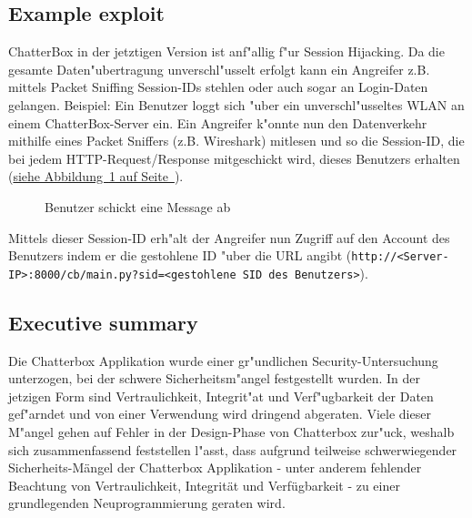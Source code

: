 \documentclass[12pt,a4paper,titlepage,oneside]{scrartcl}
\begin{document}
\subsection{Example exploit}
ChatterBox in der jetztigen Version ist anf"allig f"ur Session Hijacking. Da die gesamte Daten"ubertragung unverschl"usselt erfolgt kann ein Angreifer z.B. mittels Packet Sniffing Session-IDs stehlen oder auch sogar an Login-Daten gelangen.
\newline
\newline
Beispiel:
\newline
Ein Benutzer loggt sich "uber ein unverschl"usseltes WLAN an einem ChatterBox-Server ein. Ein Angreifer k"onnte nun den Datenverkehr mithilfe eines Packet Sniffers (z.B. Wireshark) mitlesen und so die Session-ID, die bei jedem HTTP-Request/Response mitgeschickt wird, dieses Benutzers erhalten (\hyperref[fig:message]{siehe Abbildung~\ref*{fig:message} auf Seite~\pageref*{fig:message}}).
\begin{figure}[h!]
  \centering
  \caption{Benutzer schickt eine Message ab}
  \label{fig:message}
\end{figure}
\newline
\newline
Mittels dieser Session-ID erh"alt der Angreifer nun Zugriff auf den Account des Benutzers indem er die gestohlene ID "uber die URL angibt (\lstinline{http://<Server-IP>:8000/cb/main.py?sid=<gestohlene SID des Benutzers>}).

\subsection{Executive summary}
Die Chatterbox Applikation wurde einer gr"undlichen Security-Untersuchung unterzogen, bei der schwere Sicherheitsm"angel festgestellt wurden. In der jetzigen Form sind Vertraulichkeit, Integrit"at und Verf"ugbarkeit der Daten gef"arndet und von einer Verwendung wird dringend abgeraten. Viele dieser M"angel gehen auf Fehler in der Design-Phase von Chatterbox zur"uck, weshalb sich zusammenfassend feststellen l"asst, dass aufgrund teilweise schwerwiegender Sicherheits-Mängel der Chatterbox Applikation - unter anderem fehlender Beachtung von Vertraulichkeit, Integrität und Verfügbarkeit - zu einer grundlegenden Neuprogrammierung geraten wird.
\end{document}
